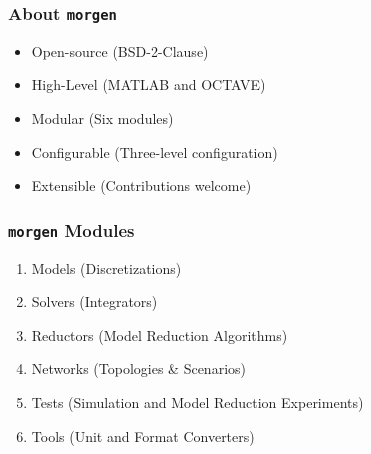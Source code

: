 \documentclass[%
aspectratio=43 %
,table %
]{beamer}
\begin{document}

\begin{frame}\frametitle{About \texttt{morgen}}

\Large

\begin{itemize}

 \item Open-source {\normalsize (BSD-2-Clause)}

 \item High-Level {\normalsize (MATLAB and OCTAVE)}

 \item Modular {\normalsize (Six modules)}

 \item Configurable {\normalsize (Three-level configuration)}

 \item Extensible {\normalsize (Contributions welcome)}

\end{itemize}

\end{frame}


\begin{frame}\frametitle{\texttt{morgen} Modules}

\Large

\begin{enumerate}

 \item Models {\normalsize (Discretizations)}

 \item Solvers {\normalsize (Integrators)}

 \item Reductors {\normalsize (Model Reduction Algorithms)}

 \item Networks {\normalsize (Topologies \& Scenarios)}

 \item Tests {\normalsize (Simulation and Model Reduction Experiments)}

 \item Tools {\normalsize (Unit and Format Converters)}

\end{enumerate}

\end{frame}
\end{document}
